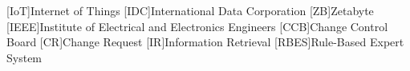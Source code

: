 \begin{acronym}[ACRONYM] 
[IoT]{Internet of Things}
[IDC]{International Data Corporation}
[ZB]{Zetabyte}
[IEEE]{Institute of Electrical and Electronics Engineers}
[CCB]{Change Control Board}
[CR]{Change Request}
[IR]{Information Retrieval}
[RBES]{Rule-Based Expert System}
\end{acronym}